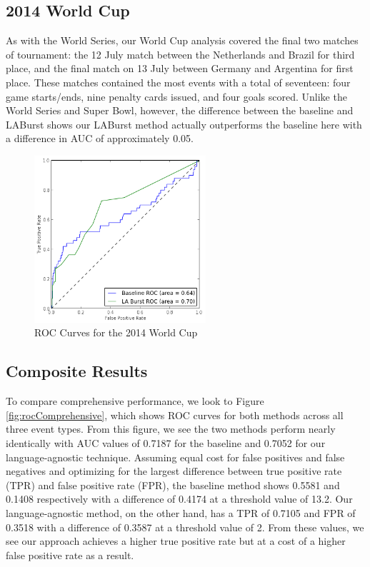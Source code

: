 \documentclass{acm_proc_article-sp}
\begin{document}
\subsection{2014 World Cup}

As with the World Series, our World Cup analysis covered the final two matches of tournament: the 12 July match between the Netherlands and Brazil for third place, and the final match on 13 July between Germany and Argentina for first place.
These matches contained the most events with a total of seventeen: four game starts/ends, nine penalty cards issued, and four goals scored.
Unlike the World Series and Super Bowl, however, the difference between the baseline and LABurst shows our LABurst method actually outperforms the baseline here with a difference in AUC of approximately 0.05.

\begin{figure}[hbtp]
\begin{center}
\includegraphics[width=2.5in]{./figures/roc_2014_WorldCup.png}
\caption{ROC Curves for the 2014 World Cup}
\label{fig:roc2014WorldCup}
\end{center}
\end{figure}

\subsection{Composite Results}

To compare comprehensive performance, we look to Figure \ref{fig:rocComprehensive}, which shows ROC curves for both methods across all three event types.
From this figure, we see the two methods perform nearly identically with AUC values of 0.7187 for the baseline and 0.7052 for our language-agnostic technique.
Assuming equal cost for false positives and false negatives and optimizing for the largest difference between true positive rate (TPR) and false positive rate (FPR), the baseline method shows 0.5581 and 0.1408 respectively with a difference of 0.4174 at a threshold value of 13.2.
Our language-agnostic method, on the other hand, has a TPR of 0.7105 and FPR of 0.3518 with a difference of 0.3587 at a threshold value of 2.
From these values, we see our approach achieves a higher true positive rate but at a cost of a higher false positive rate as a result.
\end{document}
